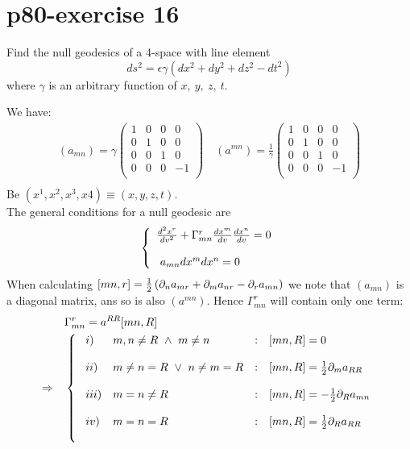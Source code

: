 \section{p80-exercise 16}
\begin{tcolorbox}
Find the null geodesics of a 4-space with line element
$$ds^2=\epsilon \gamma\left(dx^2 +dy^2+dz^2-dt^2\right)$$ where $\gamma$ is an arbitrary function of $x,\ y,\ z,\ t$.
\end{tcolorbox}
We have:
\begin{align}
\left(a_{mn}\right) = \gamma\begin{pmatrix}
 1&0  & 0 & 0 \\
 0&  1& 0 & 0 \\
 0&0  & 1 &  0\\
 0& 0 & 0 & -1 \\
\end{pmatrix} \quad \left(a^{mn}\right) = \frac{1}{\gamma}\begin{pmatrix}
 1&0  & 0 & 0 \\
 0&  1& 0 & 0 \\
 0&0  & 1 &  0\\
 0& 0 & 0 & -1 \\
\end{pmatrix}\\
\end{align}
Be $(x^1,x^2,x^3,x4) \equiv (x,y,z,t)$.\\
The general conditions for a null geodesic are
\begin{align}
\left \{ \begin {array}{l}
\dv[2]{x^r}{v} + \Gamma^r_{mn}\dv{x^m}{v}\dv{x^n}{v} = 0\\\\
\ a_{mn}dx^mdx^n =0
\end{array}\right.
\end{align}
When calculating $[mn,r] = \frac{1}{2}\left(\partial_n a_{mr}+\partial_m a_{nr}-\partial_r a_{mn} \right) $ we note that $\left(a_{mn}\right)$ is a diagonal matrix, ans so is also $\left(a^{mn}\right)$. Hence $\Gamma^r_{mn}$ will contain only one term:
\begin{align}
\ & \Gamma^r_{mn} = a^{RR}[mn,R]\\
\Rightarrow \quad & \left \{ \begin{array}{llll}
\ i)& m,n \neq R \ \wedge \ m \neq n&:& [mn,R]=0\\\\
\ ii)& m \neq n = R \ \vee \  n \neq m = R&:& [mn,R]=\frac{1}{2} \partial_m a_{RR}\\\\
\ iii)& m =n \neq R &:& [mn,R]=-\frac{1}{2} \partial_R a_{mn}\\\\
\ iv)& m =n= R &:& [mn,R]=\frac{1}{2} \partial_R a_{RR}\\\\
\end{array}\right.
\end{align}\\
